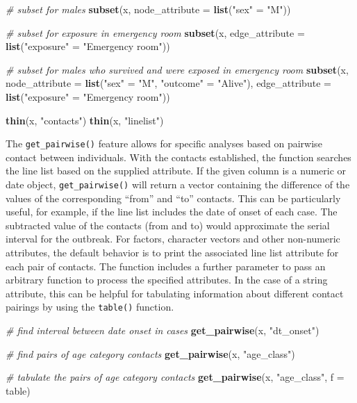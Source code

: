 \documentclass[9pt,a4paper,]{extarticle}
\newenvironment{Shaded}{\begin{snugshade}}{\end{snugshade}}
\newcommand{\KeywordTok}[1]{\textcolor[rgb]{0.13,0.29,0.53}{\textbf{#1}}}
\newcommand{\DataTypeTok}[1]{\textcolor[rgb]{0.13,0.29,0.53}{#1}}
\newcommand{\StringTok}[1]{\textcolor[rgb]{0.31,0.60,0.02}{#1}}
\newcommand{\CommentTok}[1]{\textcolor[rgb]{0.56,0.35,0.01}{\textit{#1}}}
\newcommand{\NormalTok}[1]{#1}
\theoremstyle{definition}
\theoremstyle{definition}
\theoremstyle{definition}
\theoremstyle{remark}
\begin{document}
\begin{Shaded}
\begin{Highlighting}[]
\CommentTok{# subset for males}
\KeywordTok{subset}\NormalTok{(x, }\DataTypeTok{node_attribute =} \KeywordTok{list}\NormalTok{(}\StringTok{"sex"}\NormalTok{ =}\StringTok{ "M"}\NormalTok{))}

\CommentTok{# subset for exposure in emergency room}
\KeywordTok{subset}\NormalTok{(x, }\DataTypeTok{edge_attribute =} \KeywordTok{list}\NormalTok{(}\StringTok{"exposure"}\NormalTok{ =}\StringTok{ "Emergency room"}\NormalTok{))}

\CommentTok{# subset for males who survived and were exposed in emergency room}
\KeywordTok{subset}\NormalTok{(x,}
       \DataTypeTok{node_attribute =} \KeywordTok{list}\NormalTok{(}\StringTok{"sex"}\NormalTok{ =}\StringTok{ "M"}\NormalTok{, }\StringTok{"outcome"}\NormalTok{ =}\StringTok{ "Alive"}\NormalTok{),}
       \DataTypeTok{edge_attribute =} \KeywordTok{list}\NormalTok{(}\StringTok{"exposure"}\NormalTok{ =}\StringTok{ "Emergency room"}\NormalTok{))}

\KeywordTok{thin}\NormalTok{(x, }\StringTok{"contacts"}\NormalTok{)}
\KeywordTok{thin}\NormalTok{(x, }\StringTok{"linelist"}\NormalTok{)  }
\end{Highlighting}
\end{Shaded}

The \texttt{get\_pairwise()} feature allows for specific analyses based on pairwise contact between individuals. With the contacts established, the function searches the line list based on the supplied attribute. If the given column is a numeric or date object, \texttt{get\_pairwise()} will return a vector containing the difference of the values of the corresponding ``from'' and ``to'' contacts. This can be particularly useful, for example, if the line list includes the date of onset of each case. The subtracted value of the contacts (from and to) would approximate the serial interval for the outbreak\citep{fine:2003}. For factors, character vectors and other non-numeric attributes, the default behavior is to print the associated line list attribute for each pair of contacts. The function includes a further parameter to pass an arbitrary function to process the specified attributes. In the case of a string attribute, this can be helpful for tabulating information about different contact pairings by using the \texttt{table()} function.

\begin{Shaded}
\begin{Highlighting}[]
\CommentTok{# find interval between date onset in cases}
\KeywordTok{get_pairwise}\NormalTok{(x, }\StringTok{"dt_onset"}\NormalTok{)}

\CommentTok{# find pairs of age category contacts}
\KeywordTok{get_pairwise}\NormalTok{(x, }\StringTok{"age_class"}\NormalTok{)}

\CommentTok{# tabulate the pairs of age category contacts}
\KeywordTok{get_pairwise}\NormalTok{(x, }\StringTok{"age_class"}\NormalTok{, }\DataTypeTok{f =}\NormalTok{ table)}
\end{Highlighting}
\end{Shaded}
\end{document}
